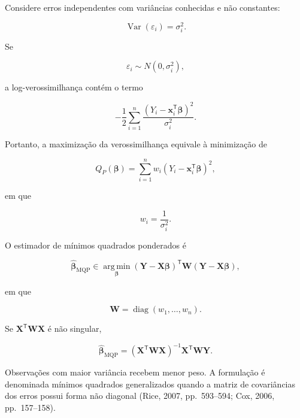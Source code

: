 \documentclass[
  letterpaper,
  DIV=11,
  numbers=noendperiod]{scrreprt}
\begin{document}
Considere erros independentes com variâncias conhecidas e não
constantes:

\[\operatorname{Var}(\varepsilon_i)
=
\sigma_i^2.\]

Se

\[\varepsilon_i
\sim
N(0,\sigma_i^2),\]

a log-verossimilhança contém o termo

\[-\frac{1}{2}
\sum_{i=1}^n
\frac{
(Y_i-\mathbf{x}_i^\mathsf{T}\boldsymbol\beta)^2
}{
\sigma_i^2
}.\]

Portanto, a maximização da verossimilhança equivale à minimização de

\[Q_P(\boldsymbol\beta)
=
\sum_{i=1}^n
w_i
(Y_i-\mathbf{x}_i^\mathsf{T}\boldsymbol\beta)^2,\]

em que

\[w_i
=
\frac{1}{\sigma_i^2}.\]

\begin{tcolorbox}[enhanced jigsaw, colback=white, leftrule=.75mm, colbacktitle=quarto-callout-important-color!10!white, breakable, titlerule=0mm, bottomtitle=1mm, title=\textcolor{quarto-callout-important-color}{\faExclamation}\hspace{0.5em}{Definição: mínimos quadrados ponderados}, colframe=quarto-callout-important-color-frame, toprule=.15mm, opacityback=0, bottomrule=.15mm, opacitybacktitle=0.6, arc=.35mm, toptitle=1mm, rightrule=.15mm, coltitle=black, left=2mm]

O estimador de mínimos quadrados ponderados é

\[\widehat{\boldsymbol\beta}_{\mathrm{MQP}}
\in
\operatorname*{arg\,min}_{\boldsymbol\beta}
(\mathbf{Y}-\mathbf{X}\boldsymbol\beta)^\mathsf{T}
\mathbf{W}
(\mathbf{Y}-\mathbf{X}\boldsymbol\beta),\]

em que

\[\mathbf{W}
=
\operatorname{diag}(w_1,\ldots,w_n).\]

\end{tcolorbox}

Se \(\mathbf{X}^\mathsf{T}\mathbf{W}\mathbf{X}\) é não singular,

\[\widehat{\boldsymbol\beta}_{\mathrm{MQP}}
=
(\mathbf{X}^\mathsf{T}\mathbf{W}\mathbf{X})^{-1}
\mathbf{X}^\mathsf{T}\mathbf{W}\mathbf{Y}.\]

Observações com maior variância recebem menor peso. A formulação é
denominada mínimos quadrados generalizados quando a matriz de
covariâncias dos erros possui forma não diagonal (Rice, 2007,
pp.~593--594; Cox, 2006, pp.~157--158).
\end{document}
